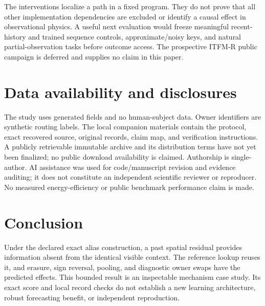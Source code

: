 \documentclass[11pt]{article}
\begin{document}
The interventions localize a path in a fixed program. They do not prove that
all other implementation dependencies are excluded or identify a causal effect
in observational physics. A useful next evaluation would freeze meaningful
recent-history and trained sequence controls, approximate/noisy keys, and
natural partial-observation tasks before outcome access. The prospective
ITFM-R public campaign is deferred and supplies no claim in this paper.

\section{Data availability and disclosures}
The study uses generated fields and no human-subject data. Owner identifiers
are synthetic routing labels. The local companion materials contain the
protocol, exact recovered source, original records, claim map, and verification
instructions. A publicly retrievable immutable archive and its distribution
terms have not yet been finalized; no public download availability is claimed.
Authorship is single-author. AI assistance was used for
code/manuscript revision and evidence auditing; it does not constitute an
independent scientific reviewer or reproducer. No measured energy-efficiency
or public benchmark performance claim is made.

\section{Conclusion}
Under the declared exact alias construction, a past spatial residual provides
information absent from the identical visible context. The reference lookup
reuses it, and erasure, sign reversal, pooling, and diagnostic owner swaps have
the predicted effects. This bounded result is an inspectable mechanism case
study. Its exact score and local record checks do not establish a new learning
architecture, robust forecasting benefit, or independent reproduction.



\end{document}
